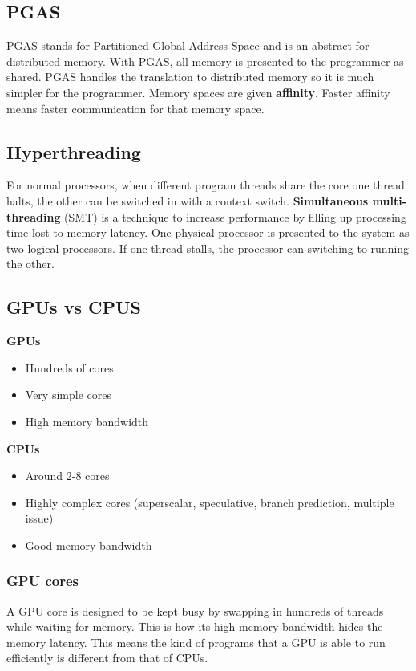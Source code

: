 \documentclass[11pt]{article}
\begin{document}
\subsection{PGAS}
PGAS stands for Partitioned Global Address Space and is an abstract for distributed memory. With PGAS, all memory is presented to the programmer as shared. PGAS handles the translation to distributed memory so it is much simpler for the programmer.
\n
Memory spaces are given \textbf{affinity}. Faster affinity means faster communication for that memory space.

\subsection{Hyperthreading}
For normal processors, when different program threads share the core one thread halts, the other can be switched in with a context switch. \textbf{Simultaneous multi-threading} (SMT) is a technique to increase performance by filling up processing time lost to memory latency. 
\n
One physical processor is presented to the system as two logical processors. If one thread stalls, the processor can switching to running the other.

\subsection{GPUs vs CPUS}
\textbf{GPUs}
\begin{itemize}
\item Hundreds of cores
\item Very simple cores
\item High memory bandwidth
\end{itemize}
\textbf{CPUs}
\begin{itemize}
\item Around 2-8 cores
\item Highly complex cores (superscalar, speculative, branch prediction, multiple issue)
\item Good memory bandwidth
\end{itemize}

\subsubsection{GPU cores}
A GPU core is designed to be kept busy by swapping in hundreds of threads while waiting for memory. This is how its high memory bandwidth hides the memory latency. This means the kind of programs that a GPU is able to run efficiently is different from that of CPUs. 
\end{document}
